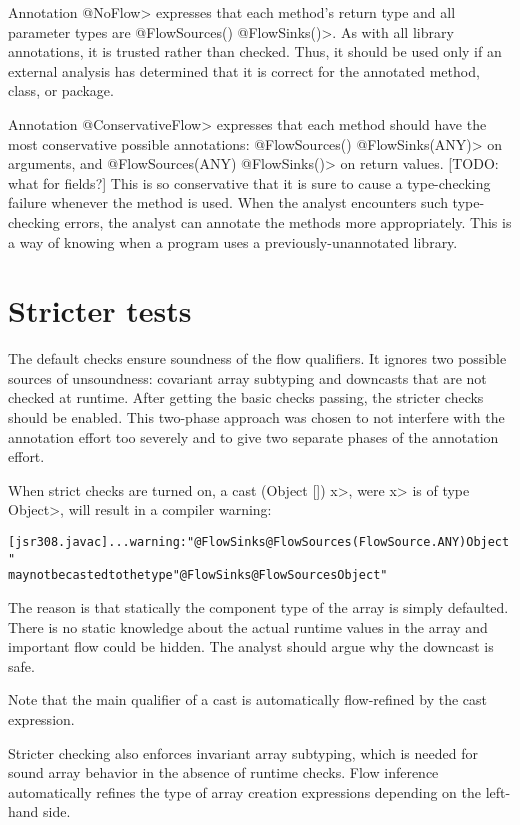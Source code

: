Annotation \<@NoFlow> expresses that each method's return type and all
parameter types are \<@FlowSources({}) @FlowSinks({})>.  As with all
library annotations, it is trusted rather than checked.  Thus, it should be
used only if an external analysis has determined that it is correct for the
annotated method, class, or package.

Annotation \<@ConservativeFlow> expresses that each method should have the
most conservative possible annotations:
  \<@FlowSources({}) @FlowSinks(ANY)> on arguments, and
  \<@FlowSources(ANY) @FlowSinks({})> on return values.
[TODO: what for fields?]
This is so conservative that it is sure to cause a type-checking failure
whenever the method is used.
When the analyst encounters such type-checking errors, the analyst can
annotate the methods more appropriately.  This is a way of knowing when a
program uses a previously-unannotated library.


\section{Stricter tests}

The default checks ensure soundness of the flow qualifiers.
It ignores two possible sources of unsoundness: covariant array
subtyping and downcasts that are not checked at runtime.
After getting the basic checks passing, the stricter checks should be
enabled.
This two-phase approach was chosen to not interfere with
the annotation effort too severely and to give two separate phases of
the annotation effort.


When strict checks are turned on,
a cast \<(Object []) x>, were \<x> is of type \<Object>, will result
in a compiler warning:

\begin{alltt}
[jsr308.javac] ... warning: "@FlowSinks @FlowSources({FlowSource.ANY}) Object"
       may not be casted to the type "@FlowSinks @FlowSources Object"
\end{alltt}

The reason is that statically the component type of the array is
simply defaulted. There is no static knowledge about the actual
runtime values in the array and important flow could be hidden.
The analyst should argue why the downcast is safe.

Note that the main qualifier of a cast is automatically flow-refined
by the cast expression.


\medskip

Stricter checking also enforces invariant array subtyping, which is
needed for sound array behavior in the absence of runtime checks.
Flow inference automatically refines the type of array creation
expressions depending on the left-hand side.



